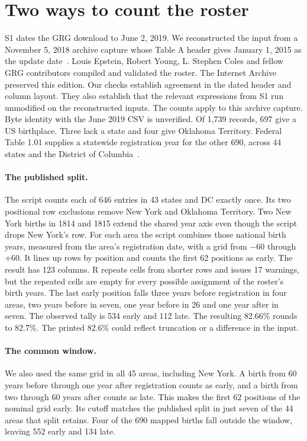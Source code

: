 \documentclass[11pt]{article}
\begin{document}
\section{Two ways to count the roster}
S1 dates the GRG download to June 2, 2019. We reconstructed the input from a November 5, 2018 archive capture whose Table A header gives January 1, 2015 as the update date~\cite{grg}. Louis Epstein, Robert Young, L. Stephen Coles and fellow GRG contributors compiled and validated the roster. The Internet Archive preserved this edition. Our checks establish agreement in the dated header and column layout. They also establish that the relevant expressions from S1 run unmodified on the reconstructed inputs. The counts apply to this archive capture. Byte identity with the June 2019 CSV is unverified. Of 1,739 records, 697 give a US birthplace. Three lack a state and four give Oklahoma Territory. Federal Table 1.01 supplies a statewide registration year for the other 690, across 44 states and the District of Columbia~\cite{nchs}.

\paragraph{The published split.}
The script counts each of 646 entries in 43 states and DC exactly once. Its two positional row exclusions remove New York and Oklahoma Territory. Two New York births in 1814 and 1815 extend the shared year axis even though the script drops New York's row. For each area the script combines those national birth years, measured from the area's registration date, with a grid from $-60$ through $+60$. It lines up rows by position and counts the first 62 positions as early. The result has 123 columns. R repeats cells from shorter rows and issues 17 warnings, but the repeated cells are empty for every possible assignment of the roster's birth years. The last early position falls three years before registration in four areas, two years before in seven, one year before in 26 and one year after in seven. The observed tally is 534 early and 112 late. The resulting 82.66\% rounds to 82.7\%. The printed 82.6\% could reflect truncation or a difference in the input.

\paragraph{The common window.}
We also used the same grid in all 45 areas, including New York. A birth from 60 years before through one year after registration counts as early, and a birth from two through 60 years after counts as late. This makes the first 62 positions of the nominal grid early. Its cutoff matches the published split in just seven of the 44 areas that split retains. Four of the 690 mapped births fall outside the window, leaving 552 early and 134 late.
\end{document}
